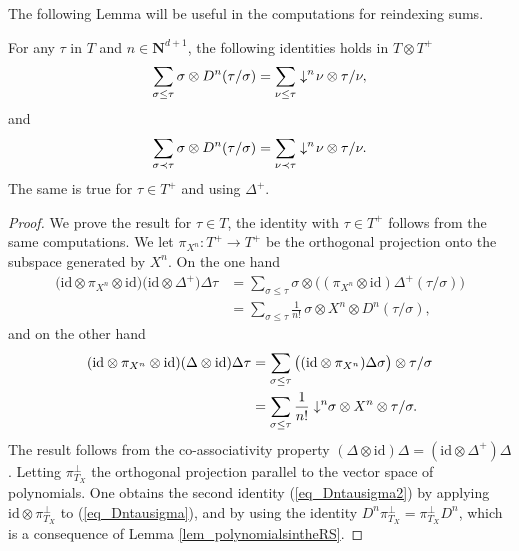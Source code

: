 \documentclass[11pt]{preprint}
\def\id{\mathrm{id}}
\def\eqref#1{(\ref{#1})}
\newcommand{\bfN}{\mathbf{N}}
\begin{document}
	The following Lemma will be useful in the computations for reindexing sums.
	\begin{lemma}\label{lem_SnDnreindex}
		For any $\tau$ in $T$ and $n\in\bfN^{d+1}$, the following identities holds in $T\otimes T^{+}$
		\begin{equation} \label{eq_Dntausigma}
			\sum_{\sigma\leq\tau} \sigma \otimes D^n(\tau/\sigma)= \sum_{\nu\leq\tau} \downarrow^n\hspace{-2pt} \nu \otimes \tau/\nu,
		\end{equation}
		and
		\begin{equation} \label{eq_Dntausigma2}
			\sum_{\sigma\prec\tau} \sigma \otimes D^n(\tau/\sigma) = \sum_{\nu\prec\tau} \downarrow^n\hspace{-2pt} \nu \otimes \tau/\nu.
		\end{equation}
		The same is true for $\tau \in T^+$ and using $ \Delta^{\!+} $.
	\end{lemma}
	\begin{proof}
		We prove the result for $\tau\in T$, the identity with $\tau\in T^+$ follows from the same computations. We let $\pi_{X^n} : T^+\rightarrow T^+$ be the orthogonal projection onto the subspace generated by $ X^n$. On the one hand 
		\begin{align*}
			\big(\text{id} \otimes \pi_{X^n} \otimes \text{id} \big)\big(\id \otimes \Delta^{\!+} \big)\Delta\tau 
			&=
			\sum_{\sigma\leq\tau} \sigma \otimes \big( ( \pi_{X^n} \otimes \id) \Delta^{\!+} (\tau/\sigma) \big)
			\\
			&=\sum_{\sigma\leq\tau }\frac{1}{n!} \, \sigma \otimes X^n \otimes D^n(\tau/\sigma),
		\end{align*}
		and on the other hand
		\begin{align*}
			(\text{id} \otimes \pi_{X^n} \otimes \text{id}  )(\Delta \otimes\id)\Delta \tau 
			&=
			\sum_{\sigma\leq\tau}   \big(   (\id \otimes \pi_{X^n} ) \Delta \sigma        \big) \otimes \tau/\sigma
			\\
			&=\sum_{\sigma\leq\tau }\frac{1}{n!}  \downarrow^n\hspace{-3pt}\sigma \otimes X^n \otimes \tau/\sigma.
		\end{align*}
		The result follows from the co-associativity property $(\Delta \otimes \text{id} )\Delta = (\text{id}\otimes\Delta^{\!+})\Delta$. 
	Letting $\pi^{\perp}_{T_X}$ the orthogonal projection parallel to the vector space of polynomials. One obtains the second identity \eqref{eq_Dntausigma2} by applying $\id \otimes \pi^{\perp}_{T_X} $ to \eqref{eq_Dntausigma}, and by using the identity $D^n\pi^{\perp}_{T_X} = \pi^{\perp}_{T_X} D^n$, which is a consequence of Lemma \ref{lem_polynomialsintheRS}.	
	\end{proof}
	
\end{document}
